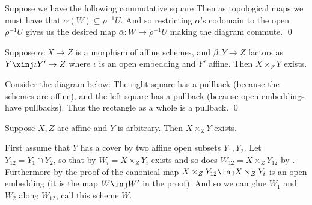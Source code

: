 \elemm

\bproof

    Suppose we have the following commutative square
        {\alpha}{\iota}{\beta}{\rho}
    Then as topological maps we must have that $\alpha(W)\subseteq\rho^{-1}U$.
    And so restricting $\alpha$'s codomain to the open $\rho^{-1}U$ gives us the desired map
    $\bar\alpha\colon W\to\rho^{-1}U$ making the diagram commute.
    \qed

\eproof

\blemm[name={pullbackalmostaffine}]

    Suppose $\alpha\colon X\to Z$ is a morphism of affine schemes, and $\beta\colon Y\to Z$
    factors as $Y\xinj\iota Y'\to Z$ where $\iota$ is an open embedding and $Y'$ affine.
    Then $X\times_ZY$ exists.

\elemm

\bproof

    Consider the diagram below:
    The right square has a pullback (because the schemes are affine), and the left square has a pullback
    (because open embeddings have pullbacks).
    Thus the rectangle as a whole is a pullback.
    \qed

\eproof

\blemm[name={pullbackyarb}]

    Suppose $X,Z$ are affine and $Y$ is arbitrary.
    Then $X\times_ZY$ exists.

\elemm

\bproof

    First assume that $Y$ has a cover by two affine open subsets $Y_1,Y_2$.
    Let $Y_{12}=Y_1\cap Y_2$, so that by  $W_i=X\times_ZY_i$ exists
    and so does $W_{12}=X\times_ZY_{12}$ by .
    Furthermore by the proof of  the canonical map
    $X\times_ZY_{12}\inj X\times_ZY_i$ is an open embedding (it is the map $W\inj W'$ in the proof).
    And so we can glue $W_1$ and $W_2$ along $W_{12}$, call this scheme $W$.

